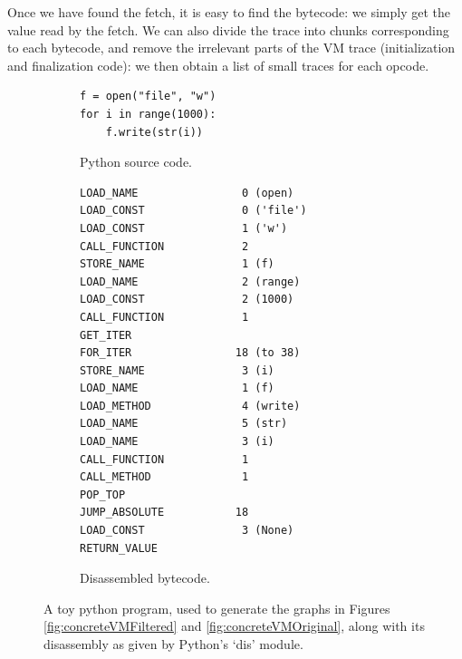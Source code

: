 \documentclass[english]{article}
\begin{document}
Once we have found the fetch, it is easy to find the bytecode: we simply get the value read by the fetch. We can also divide the trace into chunks corresponding to each bytecode, and remove the irrelevant parts of the VM trace (initialization and finalization code): we then obtain a list of small traces for each opcode.

\begin{figure}[htp]
	\centering 
	\begin{subfigure}{.5\textwidth}
		\centering 	
		\begin{BVerbatim}
f = open("file", "w")
for i in range(1000):
	f.write(str(i))
		\end{BVerbatim}
		\caption{Python source code.}
		\label{fig:examplePythonProg:source}
	\end{subfigure}%
	\begin{subfigure}{.5\textwidth}
		\centering 	
		\begin{BVerbatim}
LOAD_NAME                0 (open)
LOAD_CONST               0 ('file')
LOAD_CONST               1 ('w')
CALL_FUNCTION            2
STORE_NAME               1 (f)
LOAD_NAME                2 (range)
LOAD_CONST               2 (1000)
CALL_FUNCTION            1
GET_ITER
FOR_ITER                18 (to 38)
STORE_NAME               3 (i)
LOAD_NAME                1 (f)
LOAD_METHOD              4 (write)
LOAD_NAME                5 (str)
LOAD_NAME                3 (i)
CALL_FUNCTION            1
CALL_METHOD              1
POP_TOP
JUMP_ABSOLUTE           18
LOAD_CONST               3 (None)
RETURN_VALUE
		\end{BVerbatim}
		\caption{Disassembled bytecode.}
		\label{fig:examplePythonProg:bytecode}
	\end{subfigure}
	\caption{A toy python program, used to generate the graphs in Figures \ref{fig:concreteVMFiltered} and \ref{fig:concreteVMOriginal}, along with its disassembly as given by Python's `dis' module.}
	\label{fig:examplePythonProg}
\end{figure}
\end{document}
